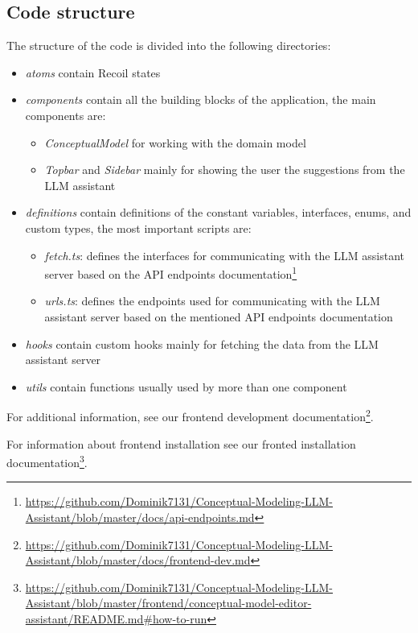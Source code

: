 \subsection{Code structure}

\noindent{}The structure of the code is divided into the following directories:
\begin{itemize}
\item \textit{atoms} contain Recoil states
\item \textit{components} contain all the building blocks of the application, the main components are:
\begin{itemize}
\item \textit{ConceptualModel} for working with the domain model
\item \textit{Topbar} and \textit{Sidebar} mainly for showing the user the suggestions from the LLM assistant
\end{itemize}
\item \textit{definitions} contain definitions of the constant variables, interfaces, enums, and custom types, the most important scripts are:
\begin{itemize}
\item \textit{fetch.ts}: defines the interfaces for communicating with the LLM assistant server based on the API endpoints documentation\footnote{\url{https://github.com/Dominik7131/Conceptual-Modeling-LLM-Assistant/blob/master/docs/api-endpoints.md}}
\item \textit{urls.ts}: defines the endpoints used for communicating with the LLM assistant server based on the mentioned API endpoints documentation
\end{itemize}
\item \textit{hooks} contain custom hooks mainly for fetching the data from the LLM assistant server
\item \textit{utils} contain functions usually used by more than one component
\end{itemize}


\noindent{}For additional information, see our frontend development documentation\footnote{\url{https://github.com/Dominik7131/Conceptual-Modeling-LLM-Assistant/blob/master/docs/frontend-dev.md}}.

For information about frontend installation see our fronted installation documentation\footnote{\url{https://github.com/Dominik7131/Conceptual-Modeling-LLM-Assistant/blob/master/frontend/conceptual-model-editor-assistant/README.md\#how-to-run}}.



